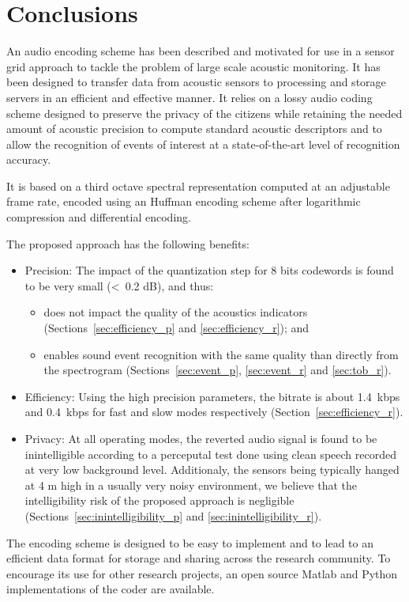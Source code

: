 \documentclass[sensors,article,accept,moreauthors,pdftex,10pt,a4paper]{mdpi}
\begin{document}
\section{Conclusions}

An audio encoding scheme has been described and motivated for use in a sensor grid approach to tackle the problem of large scale acoustic monitoring. It has been designed to transfer data from acoustic sensors to processing and storage servers in an efficient and effective manner. It relies on a lossy audio coding scheme designed to preserve the privacy of the citizens while retaining the needed amount of acoustic precision to compute standard acoustic descriptors and to allow the recognition of events of interest at a state-of-the-art level of recognition accuracy.

It is based on a third octave spectral representation computed at an adjustable frame rate, encoded using an Huffman encoding scheme after logarithmic compression and differential encoding.

The proposed approach has the following benefits:
\begin{itemize}[leftmargin=*,labelsep=5.5mm]
	\item Precision: {The} impact of the quantization step for 8 bits codewords is found to be very small {(<~0.2 dB),} and thus:
	\begin{itemize}[leftmargin=*,labelsep=5.6mm]
	\item does not impact the quality of the acoustics indicators (Sections~\ref{sec:efficiency_p}  { and \ref{sec:efficiency_r}); and}
	\item enables sound event recognition with the same quality than directly from the spectrogram (Sections~\ref{sec:event_p}, \ref{sec:event_r} and \ref{sec:tob_r}).
	\end{itemize}
	\item Efficiency: {Using} the high precision parameters, the bitrate is about 1.4~kbps and 0.4~kbps for fast and slow modes respectively (Section~\ref{sec:efficiency_r}).
	\item Privacy: {At} all operating modes, the reverted audio signal is found to be inintelligible according to a perceputal test done using clean speech recorded at very low background level. Additionaly, the sensors being typically hanged at 4 m high in a usually very noisy environment, we believe that the intelligibility risk of the proposed approach is negligible (Sections~\ref{sec:inintelligibility_p} and \ref{sec:inintelligibility_r}).
\end{itemize}
The encoding scheme is designed to be easy to implement and to lead to an efficient data format for storage and sharing across the research community. To encourage its use for other research projects, an open source Matlab and Python implementations of the coder are available.
\end{document}
